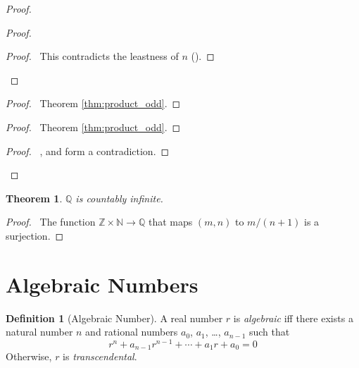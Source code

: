 \documentclass{book}
\let\qed\relax
\newtheorem{thm}[ax]{Theorem}
\theoremstyle{definition}
\newtheorem{df}[ax]{Definition}
\begin{document}
\begin{proof}
\pf
{}
\begin{proof}
	\qedstep
	\begin{proof}
		\pf\ This contradicts the leastness of $n$ ().
	\end{proof}
\end{proof}
\begin{proof}
	\pf\ Theorem \ref{thm:product_odd}.
\end{proof}
\begin{proof}
	\pf\ Theorem \ref{thm:product_odd}.
\end{proof}
\qedstep
\begin{proof}
	\pf\ ,  and  form a contradiction.
\end{proof}
\qed
\end{proof}

\begin{thm}
$\mathbb{Q}$ is countably infinite.
\end{thm}

\begin{proof}
\pf\ The function $\mathbb{Z} \times \mathbb{N} \rightarrow \mathbb{Q}$ that maps $(m,n)$ to $m/(n+1)$ is a surjection. \qed
\end{proof}

\section{Algebraic Numbers}


\begin{df}[Algebraic Number]
A real number $r$ is \emph{algebraic} iff there exists a natural number $n$ and rational numbers $a_0$, $a_1$, \ldots, $a_{n-1}$ such that
\[ r^n + a_{n-1} r^{n-1} + \cdots + a_1 r + a_0 = 0 \]
Otherwise, $r$ is \emph{transcendental}.
\end{df}
\end{document}
